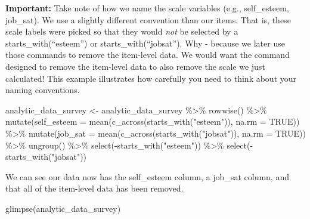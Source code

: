 \documentclass[
]{krantz}
\makeatletter
\newenvironment{Shaded}{\begin{snugshade}}{\end{snugshade}}
\newcommand{\AttributeTok}[1]{\textcolor[rgb]{0.61,0.61,0.61}{#1}}
\newcommand{\ConstantTok}[1]{\textcolor[rgb]{0,0,0}{#1}}
\newcommand{\FunctionTok}[1]{\textcolor[rgb]{0,0,0}{#1}}
\newcommand{\NormalTok}[1]{#1}
\newcommand{\OtherTok}[1]{\textcolor[rgb]{0.37,0.37,0.37}{#1}}
\newcommand{\SpecialCharTok}[1]{\textcolor[rgb]{0,0,0}{#1}}
\newcommand{\StringTok}[1]{\textcolor[rgb]{0.5,0.5,0.5}{#1}}
\newenvironment{kframe}{%
\medskip{}
\setlength{\fboxsep}{.8em}
 \def\at@end@of@kframe{}%
 \ifinner\ifhmode%
  \def\at@end@of@kframe{\end{minipage}}%
  \begin{minipage}{\columnwidth}%
 \fi\fi%
 \def\FrameCommand##1{\hskip\@totalleftmargin \hskip-\fboxsep
 \colorbox{shadecolor}{##1}\hskip-\fboxsep
     \hskip-\linewidth \hskip-\@totalleftmargin \hskip\columnwidth}%
 \MakeFramed {\advance\hsize-\width
   \@totalleftmargin\z@ \linewidth\hsize
   \@setminipage}}%
 {\par\unskip\endMakeFramed%
 \at@end@of@kframe}
\renewenvironment{Shaded}{\begin{kframe}}{\end{kframe}}
\makeatother
\begin{document}
\textbf{Important:} Take note of how we name the scale variables (e.g., self\_esteem, job\_sat). We use a slightly different convention than our items. That is, these scale labels were picked so that they would \emph{not} be selected by a starts\_with(``esteem'') or starts\_with(``jobsat''). Why - because we later use those commands to remove the item-level data. We would want the command designed to remove the item-level data to also remove the scale we just calculated! This example illustrates how carefully you need to think about your naming conventions.

\begin{Shaded}
\begin{Highlighting}[]
\NormalTok{analytic\_data\_survey }\OtherTok{\textless{}{-}}\NormalTok{ analytic\_data\_survey }\SpecialCharTok{\%\textgreater{}\%} 
  \FunctionTok{rowwise}\NormalTok{() }\SpecialCharTok{\%\textgreater{}\%} 
  \FunctionTok{mutate}\NormalTok{(}\AttributeTok{self\_esteem =} \FunctionTok{mean}\NormalTok{(}\FunctionTok{c\_across}\NormalTok{(}\FunctionTok{starts\_with}\NormalTok{(}\StringTok{"esteem"}\NormalTok{)),}
                               \AttributeTok{na.rm =} \ConstantTok{TRUE}\NormalTok{)) }\SpecialCharTok{\%\textgreater{}\%}
  \FunctionTok{mutate}\NormalTok{(}\AttributeTok{job\_sat =} \FunctionTok{mean}\NormalTok{(}\FunctionTok{c\_across}\NormalTok{(}\FunctionTok{starts\_with}\NormalTok{(}\StringTok{"jobsat"}\NormalTok{)),}
                               \AttributeTok{na.rm =} \ConstantTok{TRUE}\NormalTok{)) }\SpecialCharTok{\%\textgreater{}\%}
  \FunctionTok{ungroup}\NormalTok{() }\SpecialCharTok{\%\textgreater{}\%}
  \FunctionTok{select}\NormalTok{(}\SpecialCharTok{{-}}\FunctionTok{starts\_with}\NormalTok{(}\StringTok{"esteem"}\NormalTok{)) }\SpecialCharTok{\%\textgreater{}\%}
  \FunctionTok{select}\NormalTok{(}\SpecialCharTok{{-}}\FunctionTok{starts\_with}\NormalTok{(}\StringTok{"jobsat"}\NormalTok{)) }
\end{Highlighting}
\end{Shaded}

We can see our data now has the self\_esteem column, a job\_sat column, and that all of the item-level data has been removed.

\begin{Shaded}
\begin{Highlighting}[]
\FunctionTok{glimpse}\NormalTok{(analytic\_data\_survey)}
\end{Highlighting}
\end{Shaded}
\end{document}
